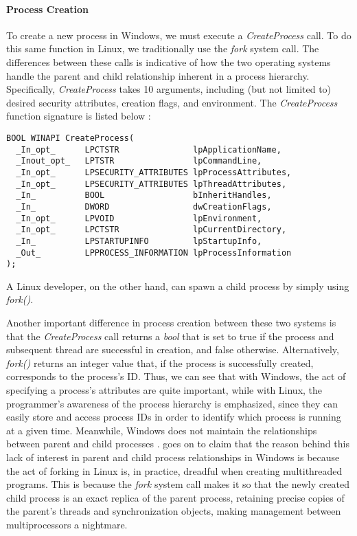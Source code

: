 \documentclass[letterpaper,10pt,titlepage]{article}
\begin{document}
\paragraph{Process Creation} To create a new process in Windows, we must execute a \emph{CreateProcess} call. To do this same function in Linux, we traditionally use the \emph{fork} system call. The differences between these calls is indicative of how the two operating systems handle the parent and child relationship inherent in a process hierarchy. Specifically, \emph{CreateProcess} takes 10 arguments, including (but not limited to) desired security attributes, creation flags, and environment. The \emph{CreateProcess} function signature is listed below \cite{windows2}:
\begin{lstlisting}
BOOL WINAPI CreateProcess(
  _In_opt_      LPCTSTR               lpApplicationName,
  _Inout_opt_   LPTSTR                lpCommandLine,
  _In_opt_      LPSECURITY_ATTRIBUTES lpProcessAttributes,
  _In_opt_      LPSECURITY_ATTRIBUTES lpThreadAttributes,
  _In_          BOOL                  bInheritHandles,
  _In_          DWORD                 dwCreationFlags,
  _In_opt_      LPVOID                lpEnvironment,
  _In_opt_      LPCTSTR               lpCurrentDirectory,
  _In_          LPSTARTUPINFO         lpStartupInfo,
  _Out_         LPPROCESS_INFORMATION lpProcessInformation
);
\end{lstlisting}
A Linux developer, on the other hand, can spawn a child process by simply using \emph{fork()}. 
\par Another important difference in process creation between these two systems is that the \emph{CreateProcess} call returns a \emph{bool} that is set to true if the process and subsequent thread are successful in creation, and false otherwise. Alternatively, \emph{fork()} returns an integer value that, if the process is successfully created, corresponds to the process's ID. Thus, we can see that with Windows, the act of specifying a process's attributes are quite important, while with Linux, the programmer's awareness of the process hierarchy is emphasized, since they can easily store and access process IDs in order to identify which process is running at a given time. Meanwhile, Windows does not maintain the relationships between parent and child processes \cite{windows3}. \cite{windows3} goes on to claim that the reason behind this lack of interest in parent and child process relationships in Windows is because the act of forking in Linux is, in practice, dreadful when creating multithreaded programs. This is because the \emph{fork} system call makes it so that the newly created child process is an exact replica of the parent process, retaining precise copies of the parent's threads and synchronization objects, making management between multiprocessors a nightmare. 
\end{document}
